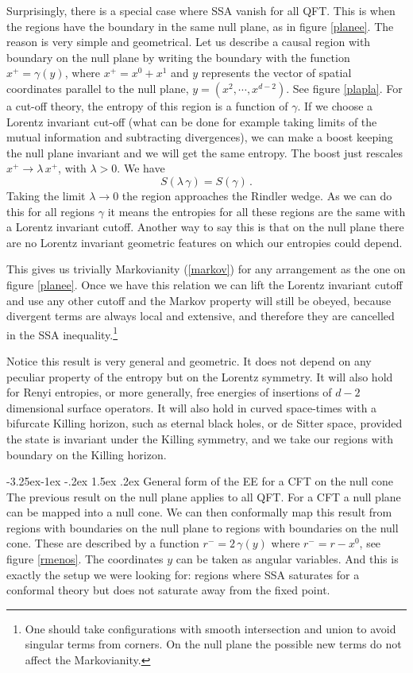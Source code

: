 \documentclass[11pt,a4paper]{article}
\makeatletter
\renewcommand\subsection{\@startsection{subsection}{2}{\z@}%
                                   {-3.25ex\@plus -1ex \@minus -.2ex}%
                                     {1.5ex \@plus .2ex}%
                                     {\normalfont\bfseries}}
\numberwithin{equation}{section}
\newcommand{\be}{\begin{equation}}
\newcommand{\ee}{\end{equation}}
\makeatother
\begin{document}
Surprisingly, there is a special case where SSA vanish for all QFT. This is when the regions have the boundary in the same null plane, as in figure \ref{planee}.   
 The reason is very simple and geometrical. Let us describe a causal region with boundary on the null plane by writing the boundary with the function $x^+=\gamma(y)$, where $x^+=x^0+x^1$ and $y$ represents the vector of spatial coordinates parallel to the null plane, $y=(x^2,\cdots,x^{d-2})$. See figure \ref{plapla}. For a cut-off theory, the entropy of this region is a function of $\gamma$. If we choose a Lorentz invariant cut-off (what can be done for example taking limits of the mutual information and subtracting divergences), we can make a boost keeping the null plane invariant and we will get the same entropy. The boost just rescales $x^+\rightarrow \lambda\, x^+$, with $\lambda>0$. We have
 \be
 S(\lambda \,\gamma)=S(\gamma)\,.
\ee 
Taking the limit $\lambda\rightarrow 0$ the region approaches the Rindler wedge. As we can do this for all regions $\gamma$ it means the entropies for all these regions are the same with a Lorentz invariant cutoff. Another way to say this is that on the null plane there are no Lorentz invariant geometric features on which our entropies could depend. 

This gives us trivially Markovianity (\ref{markov}) for any arrangement as the one on figure \ref{planee}. Once we have this relation we can lift the Lorentz invariant cutoff and use any other cutoff and the Markov property will still be obeyed, because divergent terms are always local and extensive, and therefore they are cancelled in the SSA inequality.\footnote{One should take configurations with smooth intersection and union to avoid singular terms from corners. On the null plane the possible new terms do not affect the Markovianity.}  

Notice this result is very general and geometric. It does not depend on any peculiar property of the entropy but on the Lorentz symmetry. It will also hold for Renyi entropies, or more generally, free energies of insertions of $d-2$ dimensional surface operators. It will also hold in curved space-times with a bifurcate Killing horizon, such as eternal black holes, or de Sitter space, provided the state is invariant under the Killing symmetry, and we take our regions with boundary on the Killing horizon.   




\subsection{General form of the EE for a CFT on the null cone}
The previous result on the null plane applies to all QFT. For a CFT a null plane can be mapped into a null cone. We can then conformally map this result from regions with boundaries on the null plane to regions with boundaries on the null cone. These are described by a function $r^-=2 \,\gamma(y)$ where $r^-=r-x^0$, see figure \ref{rmenos}. The coordinates $y$ can be taken as angular variables. 
 And this is exactly the setup we were looking for: regions where SSA saturates for a conformal theory but does not saturate away from the fixed point. 
\end{document}
